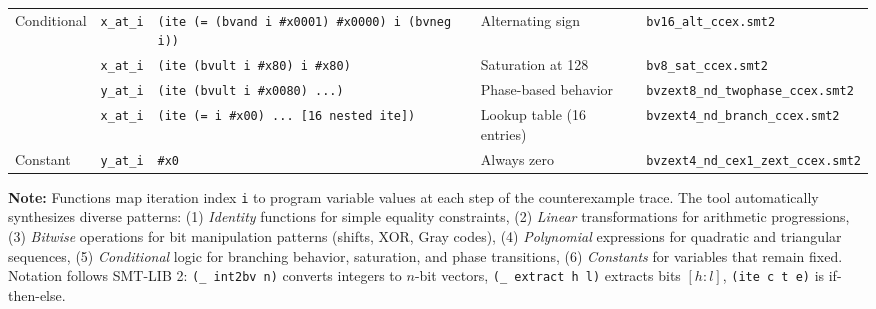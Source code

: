 \begin{table}[t]
\begin{tabular}{@{}lllp{6cm}l@{}}
\multirow{4}{*}{Conditional} 
& \texttt{x\_at\_i} & \texttt{(ite (= (bvand i \#x0001) \#x0000) i (bvneg i))} & Alternating sign & \texttt{bv16\_alt\_ccex.smt2} \\
& \texttt{x\_at\_i} & \texttt{(ite (bvult i \#x80) i \#x80)} & Saturation at 128 & \texttt{bv8\_sat\_ccex.smt2} \\
& \texttt{y\_at\_i} & \texttt{(ite (bvult i \#x0080) ...)} & Phase-based behavior & \texttt{bvzext8\_nd\_twophase\_ccex.smt2} \\
& \texttt{x\_at\_i} & \texttt{(ite (= i \#x00) ... [16 nested ite])} & Lookup table (16 entries) & \texttt{bvzext4\_nd\_branch\_ccex.smt2} \\
\midrule

Constant 
& \texttt{y\_at\_i} & \texttt{\#x0} & Always zero & \texttt{bvzext4\_nd\_cex1\_zext\_ccex.smt2} \\

\bottomrule
\end{tabular}
\vspace{0.5em}
\begin{flushleft}
\footnotesize
\textbf{Note:} Functions map iteration index \texttt{i} to program variable values at each step of the counterexample trace.
The tool automatically synthesizes diverse patterns:
(1) \textit{Identity} functions for simple equality constraints,
(2) \textit{Linear} transformations for arithmetic progressions,
(3) \textit{Bitwise} operations for bit manipulation patterns (shifts, XOR, Gray codes),
(4) \textit{Polynomial} expressions for quadratic and triangular sequences,
(5) \textit{Conditional} logic for branching behavior, saturation, and phase transitions,
(6) \textit{Constants} for variables that remain fixed.
Notation follows SMT-LIB 2: \texttt{(\_ int2bv n)} converts integers to $n$-bit vectors,
\texttt{(\_ extract h l)} extracts bits $[h:l]$, \texttt{(ite c t e)} is if-then-else.
\end{flushleft}
\end{table}
